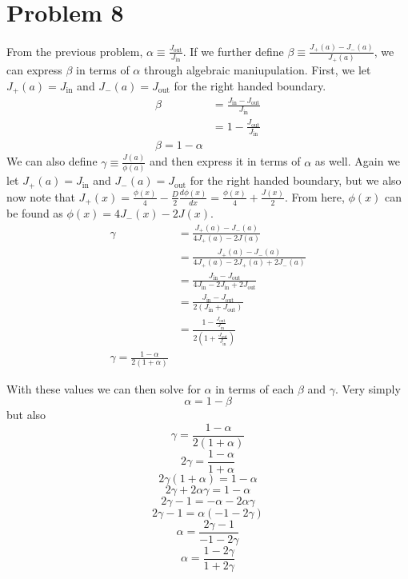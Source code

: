 \documentclass{article}
\begin{document}

\section*{Problem 8}

From the previous problem, $\alpha \equiv \frac{J_{\text{out}}}{J_{\text{in}}}$. If we further define $\beta \equiv \frac{J_+(a)-J_-(a)}{J_+(a)}$, we can express $\beta$ in terms of $\alpha$ through algebraic maniupulation. First, we let $J_+(a) = J_{\text{in}}$ and $J_-(a) = J_{\text{out}}$ for the right handed boundary.
\begin{align*}
\beta	&= \frac{J_{\text{in}}-J_{\text{out}}}{J_{\text{in}}} \\
		&= 1 - \frac{J_{\text{out}}}{J_{\text{in}}} \\
\boxed{ \beta = 1 - \alpha }
\end{align*}
We can also define $\gamma \equiv \frac{J(a)}{\phi(a)}$ and then express it in terms of $\alpha$ as well. Again we let $J_+(a) = J_{\text{in}}$ and $J_-(a) = J_{\text{out}}$ for the right handed boundary, but we also now note that $J_+(x) = \frac{\phi(x)}{4} - \frac{D}{2}\frac{d\phi(x)}{dx} = \frac{\phi(x)}{4} + \frac{J(x)}{2}$. From here, $\phi(x)$ can be found as $\phi(x) = 4J_-(x) - 2J(x)$. 
\begin{align*}
\gamma	&= \frac{J_+(a)-J_-(a)}{4J_+(a) - 2J(a)} \\
		&= \frac{J_+(a)-J_-(a)}{4J_+(a) - 2J_+(a) + 2J_-(a)} \\
		&= \frac{J_{\text{in}}-J_{\text{out}}}{4J_{\text{in}} - 2J_{\text{in}} + 2J_{\text{out}}} \\
				&= \frac{J_{\text{in}}-J_{\text{out}}}{2(J_{\text{in}} + J_{\text{out}})} \\				
				&= \frac{1-\frac{J_{\text{out}}}{J_{\text{in}}}}{2(1 + \frac{J_{\text{out}}}{J_{\text{in}}})} \\
\boxed{ \gamma = \frac{1 - \alpha}{2(1 + \alpha)} }
\end{align*}

With these values we can then solve for $\alpha$ in terms of each $\beta$ and $\gamma$. Very simply
$$\boxed{ \alpha = 1 - \beta }$$
but also
$$ \gamma = \frac{1 - \alpha}{2(1 + \alpha)} $$
$$ 2\gamma = \frac{1 - \alpha}{1 + \alpha} $$
$$ 2\gamma(1+\alpha) = 1 - \alpha $$
$$ 2\gamma + 2\alpha\gamma = 1 - \alpha $$
$$ 2\gamma - 1 = -\alpha - 2\alpha\gamma $$
$$ 2\gamma - 1 = \alpha(-1 - 2\gamma) $$
$$ \alpha = \frac{2\gamma - 1}{-1 - 2\gamma} $$
$$\boxed{ \alpha = \frac{1-2\gamma}{1+2\gamma} }$$
\end{document}
